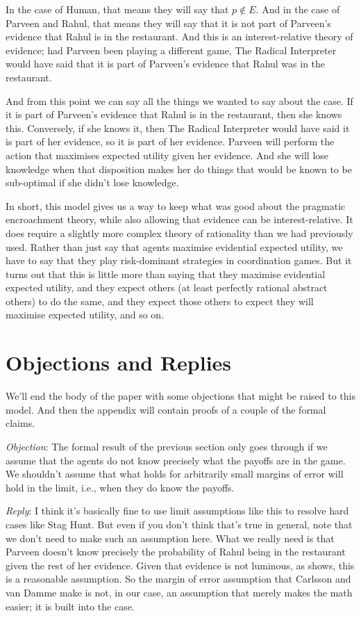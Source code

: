 In the case of Human, that means they will say that $p \notin E$. And in the case of Parveen and Rahul, that means they will say that it is not part of Parveen's evidence that Rahul is in the restaurant. And this is an interest-relative theory of evidence; had Parveen been playing a different game, The Radical Interpreter would have said that it is part of Parveen's evidence that Rahul was in the restaurant. 

And from this point we can say all the things we wanted to say about the case. If it is part of Parveen's evidence that Rahul is in the restaurant, then she knows this. Conversely, if she knows it, then The Radical Interpreter would have said it is part of her evidence, so it is part of her evidence. Parveen will perform the action that maximises expected utility given her evidence. And she will lose knowledge when that disposition makes her do things that would be known to be sub-optimal if she didn't lose knowledge.

In short, this model gives us a way to keep what was good about the pragmatic encroachment theory, while also allowing that evidence can be interest-relative. It does require a slightly more complex theory of rationality than we had previously used. Rather than just say that agents maximise evidential expected utility, we have to say that they play risk-dominant strategies in coordination games. But it turns out that this is little more than saying that they maximise evidential expected utility, and they expect others (at least perfectly rational abstract others) to do the same, and they expect those others to expect they will maximise expected utility, and so on.

\section{Objections and Replies}
\label{objectionsandreplies}

We'll end the body of the paper with some objections that might be raised to this model. And then the appendix will contain proofs of a couple of the formal claims.

\emph{Objection}: The formal result of the previous section only goes through if we assume that the agents do not know precisely what the payoffs are in the game. We shouldn't assume that what holds for arbitrarily small margins of error will hold in the limit, i.e., when they do know the payoffs.

\emph{Reply}: I think it's basically fine to use limit assumptions like this to resolve hard cases like Stag Hunt. But even if you don't think that's true in general, note that we don't need to make such an assumption here. What we really need is that Parveen doesn't know precisely the probability of Rahul being in the restaurant given the rest of her evidence. Given that evidence is not luminous, as  \citet{Williamson2000} shows, this is a reasonable assumption. So the margin of error assumption that Carlsson and van Damme make is not, in our case, an assumption that merely makes the math easier; it is built into the case.

